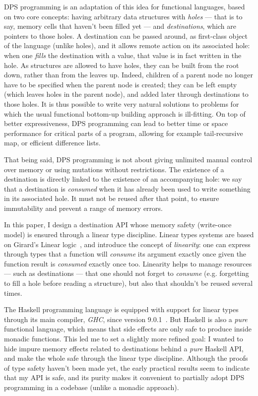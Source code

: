\documentclass[english]{jflart}
\begin{document}
DPS programming is an adaptation of this idea for functional languages, based on two core concepts: having arbitrary data structures with \emph{holes} --- that is to say, memory cells that haven't been filled yet --- and \emph{destinations}, which are pointers to those holes. A destination can be passed around, as first-class object of the language (unlike holes), and it allows remote action on its associated hole: when one \emph{fills} the destination with a value, that value is in fact written in the hole. As structures are allowed to have holes, they can be built from the root down, rather than from the leaves up. Indeed, children of a parent node no longer have to be specified when the parent node is created; they can be left empty (which leaves holes in the parent node), and added later through destinations to those holes. It is thus possible to write very natural solutions to problems for which the usual functional bottom-up building approach is ill-fitting. On top of better expressiveness, DPS programming can lead to better time or space performance for critical parts of a program, allowing for example tail-recursive map, or efficient difference lists.

That being said, DPS programming is not about giving unlimited manual control over memory or using mutations without restrictions. The existence of a destination is directly linked to the existence of an accompanying hole: we say that a destination is \emph{consumed} when it has already been used to write something in its associated hole. It must not be reused after that point, to ensure immutability and prevent a range of memory errors.

In this paper, I design a destination API whose memory safety (write-once model) is ensured through a linear type discipline. Linear types systems are based on Girard's Linear logic~\cite{girard_linear_1995}, and introduce the concept of \emph{linearity}: one can express through types that a function will \emph{consume} its argument exactly once given the function result is \emph{consumed} exactly once too. Linearity helps to manage resources --- such as destinations --- that one should not forget to \emph{consume} (e.g. forgetting to fill a hole before reading a structure), but also that shouldn't be reused several times.

The Haskell programming language is equipped with support for linear types through its main compiler, \emph{GHC}, since version 9.0.1~\cite{bernardy_linear_2018}. But Haskell is also a \emph{pure} functional language, which means that side effects are only safe to produce inside monadic functions. This led me to set a slightly more refined goal: I wanted to hide impure memory effects related to destinations behind a \emph{pure} Haskell API, and make the whole safe through the linear type discipline. Although the proofs of type safety haven't been made yet, the early practical results seem to indicate that my API is safe, and its purity makes it convenient to partially adopt DPS programming in a codebase (unlike a monadic approach).
\end{document}
